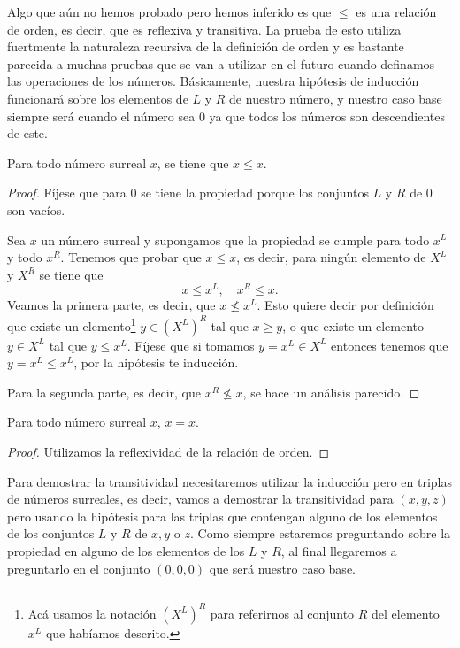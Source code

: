     Algo que a\'un no hemos probado pero hemos inferido es que $\le$ es una relaci\'on de orden, es decir, que es reflexiva y transitiva. La prueba de esto utiliza fuertmente la naturaleza recursiva de la definici\'on de orden y es bastante parecida a muchas pruebas que se van a utilizar en el futuro cuando definamos las operaciones de los n\'umeros. B\'asicamente, nuestra hip\'otesis de inducci\'on funcionar\'a sobre los elementos de $L$ y $R$ de nuestro n\'umero, y nuestro caso base siempre ser\'a cuando el n\'umero sea $0$ ya que todos los n\'umeros son descendientes de este.

    \begin{theorem}[Reflexividad]
        Para todo n\'umero surreal $x$, se tiene que $x\le x$.
    \end{theorem}

    \begin{proof}
        F\'ijese que para $0$ se tiene la propiedad porque los conjuntos $L$ y $R$ de $0$ son vac\'ios.

        Sea $x$ un n\'umero surreal y supongamos que la propiedad se cumple para todo $x^L$ y todo $x^R$. Tenemos que probar que $x\le x$, es decir, para ning\'un elemento de $X^L$ y $X^R$ se tiene que
        \[
            x \le x^L, \quad x^R \le x.
        \]
        Veamos la primera parte, es decir, que $x \not\le x^L$. Esto quiere decir por definici\'on que existe un elemento\footnote{Ac\'a usamos la notaci\'on $(X^L)^R$ para referirnos al conjunto $R$ del elemento $x^L$ que hab\'iamos descrito.} $y\in (X^L)^R$  tal que $x \ge y$, o que existe un elemento $y \in X^L$ tal que $y \le x^L$. F\'ijese que si tomamos $y = x^L \in X^L$ entonces tenemos que $y = x^L \le x^L$, por la hip\'otesis te inducci\'on.

        Para la segunda parte, es decir, que $x^R \not\le x$, se hace un an\'alisis parecido.
    \end{proof}
    
    \begin{corollary}
        Para todo n\'umero surreal $x$, $x = x$.
    \end{corollary}

    \begin{proof}
        Utilizamos la reflexividad de la relaci\'on de orden.
    \end{proof}

    Para demostrar la transitividad necesitaremos utilizar la inducci\'on pero en triplas de n\'umeros surreales, es decir, vamos a demostrar la transitividad para $(x,y,z)$ pero usando la hip\'otesis para las triplas que contengan alguno de los elementos de los conjuntos $L$ y $R$ de $x,y$ o $z$. Como siempre estaremos preguntando sobre la propiedad en alguno de los elementos de los $L$ y $R$, al final llegaremos a preguntarlo en el conjunto $(0,0,0)$ que ser\'a nuestro caso base.

